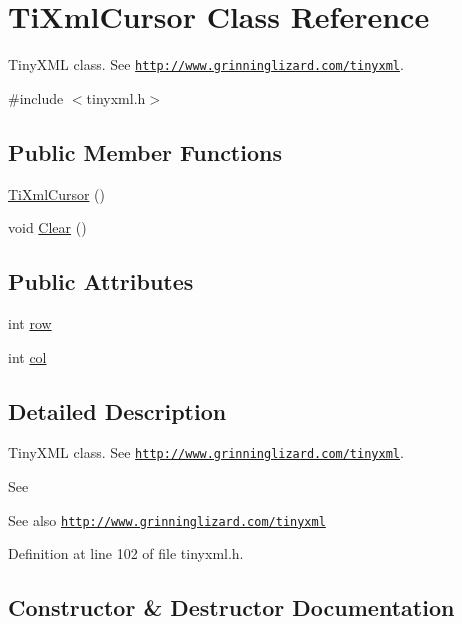 \hypertarget{struct_ti_xml_cursor}{}\section{Ti\+Xml\+Cursor Class Reference}
\label{struct_ti_xml_cursor}


Tiny\+X\+ML class. See \href{http://www.grinninglizard.com/tinyxml}{\tt http\+://www.\+grinninglizard.\+com/tinyxml}.  




{\ttfamily \#include $<$tinyxml.\+h$>$}

\subsection*{Public Member Functions}
\begin{DoxyCompactItemize}
\item 
\hyperlink{struct_ti_xml_cursor_a7ad233928a675f0271eb440b150e3ff1}{Ti\+Xml\+Cursor} ()
\item 
void \hyperlink{struct_ti_xml_cursor_a1e6fa622b59dafb71b6efe595105dcdd}{Clear} ()
\end{DoxyCompactItemize}
\subsection*{Public Attributes}
\begin{DoxyCompactItemize}
\item 
int \hyperlink{struct_ti_xml_cursor_a5b54dd949820c2db061e2be41f3effb3}{row}
\item 
int \hyperlink{struct_ti_xml_cursor_a5694d7ed2c4d20109d350c14c417969d}{col}
\end{DoxyCompactItemize}


\subsection{Detailed Description}
Tiny\+X\+ML class. See \href{http://www.grinninglizard.com/tinyxml}{\tt http\+://www.\+grinninglizard.\+com/tinyxml}. 

See \begin{DoxySeeAlso}{See also}
\href{http://www.grinninglizard.com/tinyxml}{\tt http\+://www.\+grinninglizard.\+com/tinyxml} 
\end{DoxySeeAlso}


Definition at line 102 of file tinyxml.\+h.



\subsection{Constructor \& Destructor Documentation}
\hypertarget{struct_ti_xml_cursor_a7ad233928a675f0271eb440b150e3ff1}{}\label{struct_ti_xml_cursor_a7ad233928a675f0271eb440b150e3ff1} 
